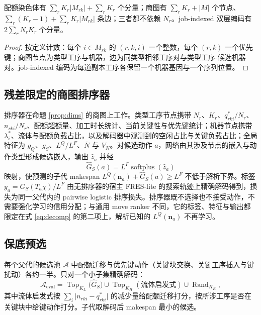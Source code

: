 \begin{proposition}[商图维度]\label{prop:dims}
配额染色体有 $\sum_r K_r \lvert M_{rk}\rvert + \sum_r K_r$ 个分量；商图有 $\sum_r K_r + \lvert M\rvert$ 个节点、$\sum_r (K_r - 1) + \sum_r K_r \lvert M_{rk}\rvert$ 条边；三者都不依赖 $N_r$。job-indexed 双层编码有 $2\sum_r N_r K_r$ 个分量。
\end{proposition}
\begin{proof}
按定义计数：每个 $i \in M_{rk}$ 的 $(r,k,i)$ 一个整数，每个 $(r,k)$ 一个优先键；商图节点为类型工序与机器，边为同类型相邻工序对与类型工序-候选机器对。job-indexed 编码为每道副本工序各保留一个机器基因与一个序列位置。
\end{proof}

\subsection{残差限定的商图排序器}\label{sec:ranker}
排序器在命题 \ref{prop:dims} 的商图上工作。类型工序节点携带 $N_r$、$K_r$、$q^*_{rki}/N_r$、$n_{rki}/N_r$、配额超额量、加工时长统计、当前关键性与优先键统计；机器节点携带 $\lambda^*_i$、流体与配额负载占比，以及解码器中观测到的空闲占比与关键负载占比；全局特征为 $g_Q$、$g_S$、$L^Q/L^F$、$\bar N$ 与 $V_N$。对候选动作 $a$，网络由其涉及节点的嵌入与动作类型形成候选嵌入，输出 $\hat z_a$ 并经
\begin{equation}
\hat G_S(a) = L^F \operatorname{softplus}(\hat z_a) \label{eq:softplus}
\end{equation}
映射，使预测的子代 makespan $L^Q(\mathbf{n}_a) + \hat G_S(a) \ge L^F$ 不低于解析下界。标签 $y_a = G_S(T_a\chi)/L^F$ 由无排序器的宿主 FRES-lite 的搜索轨迹上精确解码得到，损失为同一父代内的 pairwise logistic 排序损失。排序器既不选择也不接受动作，不需要强化学习的信用分配；与通用 move ranker 不同，它的标签、特征与输出都限定在式 \eqref{eq:decomp} 的第二项上，解析已知的 $L^Q(\mathbf{n}_a)$ 不再学习。

\subsection{保底预选}\label{sec:safeguard}
每个父代的候选池 $\mathcal{A}$ 中配额迁移与优先键动作（关键块交换、关键工序插入与键扰动）各约一半。只对一个小子集精确解码：
\begin{equation}
\mathcal{A}_{\mathrm{eval}} = \operatorname{Top}_{K_L}\bigl(\hat G_S\bigr) \cup \operatorname{Top}_{K_H}(\text{流体启发式}) \cup \operatorname{Rand}_{K_R}, \label{eq:union}
\end{equation}
其中流体启发式按 $\sum_i \lvert n_{rki} - q^*_{rki}\rvert$ 的减少量给配额迁移打分，按所涉工序是否在关键块中给键动作打分。子代取解码后 makespan 最小的候选。

